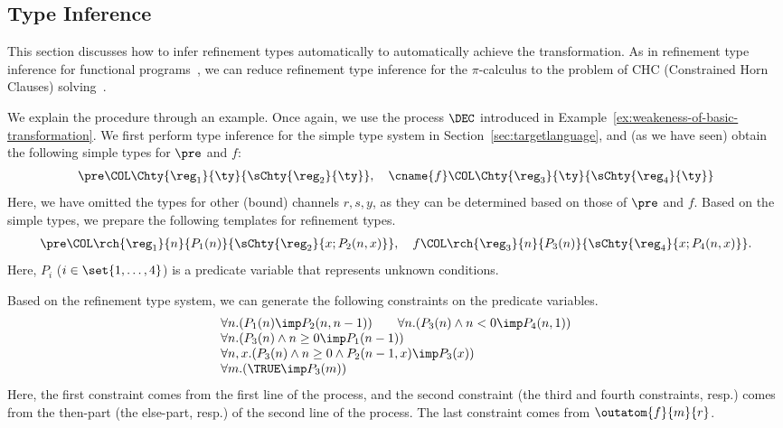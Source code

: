 \newcommand{\constr}{\mathbb{C}}
\newcommand{\Inf}[4]{\fname{Inf}(#1; #2; #3; #4)}
\newcommand{\newty}[1]{\fname{NewTy}(#1)}
\newcommand{\newtys}[1]{\fname{NewTys}(#1)}
\newcommand{\subty}[3]{\fname{SubTy}(#1; #2; #3)}
\newcommand{\subtys}[3]{\fname{SubTys}(#1; #2; #3)}

\subsection{Type Inference}  \label{sec:inference}

This section discusses how to infer refinement types automatically
to automatically achieve the transformation.
As in refinement type inference for functional programs~\cite{Jhala08,Unno09PPDP,DBLP:journals/jar/ChampionCKS20},
we can reduce refinement type inference for the \(\pi\)-calculus to
the problem of CHC (Constrained Horn Clauses) solving~\cite{Bjorner15}.

We explain the procedure through an example.
Once again, we use the process \( \DEC \) introduced in Example~\ref{ex:weakeness-of-basic-transformation}.
We first perform type inference for the simple type system in Section~\ref{sec:targetlanguage}, and (as we have seen) obtain the following simple types for \( \pre \) and \( f \):
\begin{align*}
    \pre\COL \Chty{\reg_1}{\ty}{\sChty{\reg_2}{\ty}}, \quad
    \cname{f} \COL \Chty{\reg_3}{\ty}{\sChty{\reg_4}{\ty}}
\end{align*}
Here, we have omitted the types for other (bound) channels \(r,s,y\),
as they can be determined based on those of \( \pre \) and \( f \).
Based on the simple types, we prepare the following templates for refinement types.
\begin{align*}
  \pre\COL \rch{\reg_1}{n}{P_1(n)}{\sChty{\reg_2}{x; P_2(n,x)}}, \quad
  f\COL \rch{\reg_3}{n}{P_3(n)}{\sChty{\reg_4}{x; P_4(n,x)}}.
\end{align*}
Here, \(P_i\) (\(i\in\set{1,\ldots,4}\)) is a predicate variable that represents
unknown conditions.

Based on the refinement type system, we can generate the following constraints on
the predicate variables.
\[
\begin{array}{l}
  \forall n.(P_1(n) \imp P_2(n, n-1))\qquad
  \forall n.(P_3(n)\land n<0 \imp P_4(n, 1)) \\
  \forall n.(P_3(n)\land n\ge 0 \imp P_1(n-1))\\
  \forall n,x.(P_3(n)\land n\ge 0\land P_2(n-1,x) \imp P_3(x))\\
  \forall m.(\TRUE \imp P_3(m))
\end{array}
\]
Here, the first constraint comes from the first line of the process,
and the second constraint (the third and fourth constraints, resp.)
comes from the then-part (the else-part, resp.)
of the second line of the process. The last constraint
comes from \(\outatom{f}{m}{r}\).

